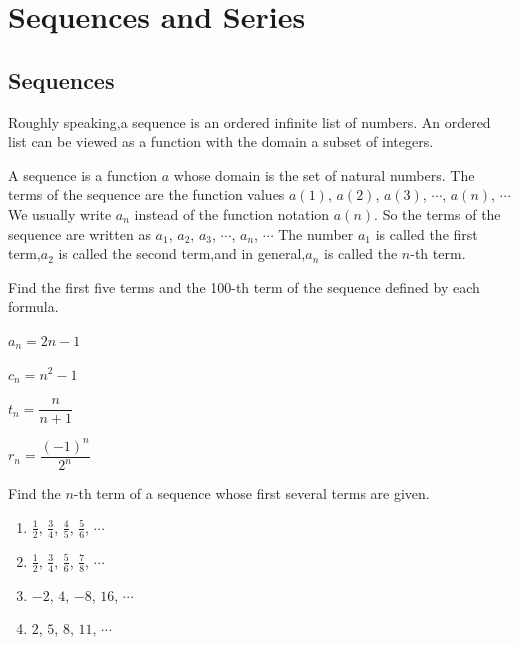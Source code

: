 
\chapter{Sequences and Series}

\section{Sequences}
Roughly speaking,a sequence is an ordered infinite list of numbers.
An ordered list can be viewed as a function with the domain a subset of integers.

\begin{definition}
A sequence is a function $a$ whose domain is the set of natural numbers. The terms of the sequence are the function values $a(1)$, $a(2)$, $a(3)$, $\cdots$, $a(n)$, $\cdots$
We usually write $a_n$ instead of the function notation $a(n)$. So the terms of the sequence are written as
$a_1$, $a_2$, $a_3$, $\cdots$, $a_n$, $\cdots$
The number $a_1$ is called the first term,$a_2$ is called the second term,and in general,$a_n$ is called the $n$-th term.
\end{definition}
\begin{example}
    Find the first five terms and the 100-th term of the sequence defined by each formula.
    \begin{enumerate*}
        \item $a_n=2n-1$
        \item $c_n=n^2-1$
        \item $t_n=\dfrac{n}{n+1}$
        \item $r_n=\dfrac{(-1)^n}{2^n}$
    \end{enumerate*}
\end{example}
\vspace*{6\baselineskip}

\begin{example}
    Find the $n$-th term of a sequence whose first several terms are given.
    \begin{enumerate}
        \item $\frac{1}{2}$, $\frac{3}{4}$, $\frac{4}{5}$, $\frac{5}{6}$, $\cdots$
        \item $\frac{1}{2}$, $\frac{3}{4}$, $\frac{5}{6}$, $\frac{7}{8}$, $\cdots$
        \item $-2$, $4$, $-8$, $16$, $\cdots$
        \item $2$, $5$, $8$, $11$, $\cdots$
    \end{enumerate}
\end{example}

